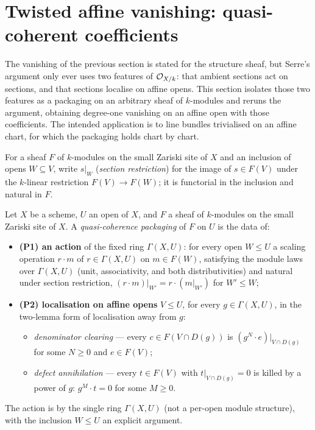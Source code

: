 \section{Twisted affine vanishing: quasi-coherent coefficients}
\label{pa-sec:qcoh_vanishing}

The vanishing of the previous section is stated for the structure sheaf, but Serre's argument
only ever uses two features of \(\mathcal{O}_{X/k}\): that ambient sections act on sections, and that
sections localise on affine opens. This section isolates those two features as a packaging on an
arbitrary sheaf of \(k\)-modules and reruns the argument, obtaining degree-one vanishing on an
affine open with those coefficients. The intended application is to line bundles trivialised on
an affine chart, for which the packaging holds chart by chart.

For a sheaf \(F\) of \(k\)-modules on the small Zariski site of \(X\) and an inclusion of opens
\(W \subseteq V\), write \(s|_W\) (\emph{section restriction}) for the image of \(s \in F(V)\)
under the \(k\)-linear restriction \(F(V) \to F(W)\); it is functorial in the inclusion and
natural in \(F\).

\begin{definition}
  \label{pa-def:qcohOn}
  \leanok

  Let \(X\) be a scheme, \(U\) an open of \(X\), and \(F\) a sheaf of \(k\)-modules on the small
  Zariski site of \(X\). A \emph{quasi-coherence packaging} of \(F\) on \(U\) is the data of:
  \begin{itemize}
    \item \textbf{(P1) an action} of the fixed ring \(\Gamma(X, U)\): for every open \(W \le U\)
      a scaling operation \(r \cdot m\) of \(r \in \Gamma(X, U)\) on \(m \in F(W)\), satisfying
      the module laws over \(\Gamma(X, U)\) (unit, associativity, and both distributivities) and
      natural under section restriction, \((r \cdot m)|_{W'} = r \cdot (m|_{W'})\) for \(W' \le
      W\);
    \item \textbf{(P2) localisation on affine opens} \(V \le U\), for every \(g \in \Gamma(X,
      U)\), in the two-lemma form of localisation away from \(g\):
      \begin{itemize}
        \item \emph{denominator clearing} — every \(c \in F(V \cap D(g))\) is \((g^N \cdot
          e)|_{V \cap D(g)}\) for some \(N \ge 0\) and \(e \in F(V)\);
        \item \emph{defect annihilation} — every \(t \in F(V)\) with \(t|_{V \cap D(g)} = 0\) is
          killed by a power of \(g\): \(g^M \cdot t = 0\) for some \(M \ge 0\).
      \end{itemize}
  \end{itemize}
  The action is by the single ring \(\Gamma(X, U)\) (not a per-open module structure), with the
  inclusion \(W \le U\) an explicit argument.
\end{definition}


